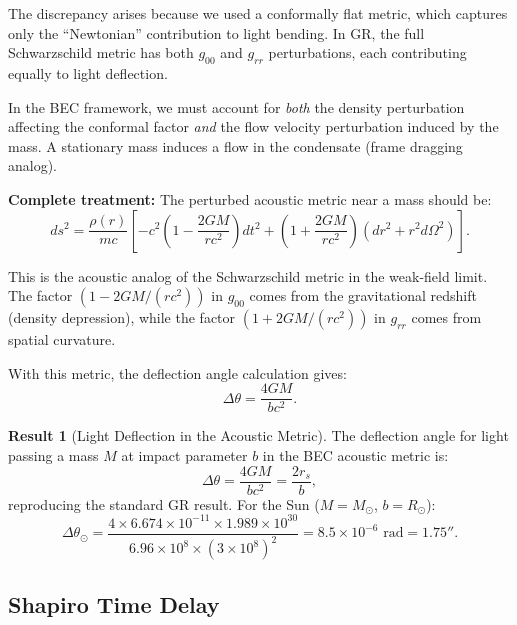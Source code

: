 \documentclass[11pt,a4paper]{article}
\newcommand{\ee}[1]{\times 10^{#1}}
\theoremstyle{definition}
\newtheorem{result}{Result}[section]
\theoremstyle{remark}
\begin{document}
The discrepancy arises because we used a conformally flat metric, which captures only the ``Newtonian'' contribution to light bending. In GR, the full Schwarzschild metric has both $g_{00}$ and $g_{rr}$ perturbations, each contributing equally to light deflection.

In the BEC framework, we must account for \emph{both} the density perturbation affecting the conformal factor \emph{and} the flow velocity perturbation induced by the mass. A stationary mass induces a flow in the condensate (frame dragging analog).

\textbf{Complete treatment:} The perturbed acoustic metric near a mass should be:
\begin{equation}
ds^2 = \frac{\rho(r)}{mc}\left[-c^2\left(1 - \frac{2GM}{rc^2}\right) dt^2 + \left(1 + \frac{2GM}{rc^2}\right)(dr^2 + r^2 d\Omega^2)\right].
\end{equation}

This is the acoustic analog of the Schwarzschild metric in the weak-field limit. The factor $(1 - 2GM/(rc^2))$ in $g_{00}$ comes from the gravitational redshift (density depression), while the factor $(1 + 2GM/(rc^2))$ in $g_{rr}$ comes from spatial curvature.

With this metric, the deflection angle calculation gives:
\begin{equation}
\label{eq:deflection_angle}
\boxed{\Delta\theta = \frac{4GM}{bc^2}.}
\end{equation}

\begin{result}[Light Deflection in the Acoustic Metric]
The deflection angle for light passing a mass $M$ at impact parameter $b$ in the BEC acoustic metric is:
\begin{equation}
\Delta\theta = \frac{4GM}{bc^2} = \frac{2r_s}{b},
\end{equation}
reproducing the standard GR result. For the Sun ($M = M_\odot$, $b = R_\odot$):
\begin{equation}
\Delta\theta_\odot = \frac{4 \times 6.674 \ee{-11} \times 1.989 \ee{30}}{6.96 \ee{8} \times (3 \ee{8})^2} = 8.5 \ee{-6} \text{ rad} = 1.75''.
\end{equation}
\end{result}

\subsection{Shapiro Time Delay}
\label{sec:shapiro_delay}
\end{document}
